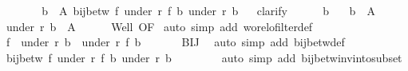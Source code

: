 \begin{isabellebody}
\ \ \isanewline
\ \ \isamarkupfalse%
\ {}{\isacharcolon}{\kern0pt}\ {\isachardoublequoteopen}{\isasymforall}b\ {\isasymin}\ A{\isachardot}{\kern0pt}\ bij{\isacharunderscore}{\kern0pt}betw\ {\isacharquery}{\kern0pt}f{\isacharprime}{\kern0pt}\ {\isacharparenleft}{\kern0pt}under\ r{\isacharprime}{\kern0pt}\ {\isacharparenleft}{\kern0pt}f\ b{\isacharparenright}{\kern0pt}{\isacharparenright}{\kern0pt}\ {\isacharparenleft}{\kern0pt}under\ r\ b{\isacharparenright}{\kern0pt}{\isachardoublequoteclose}\isanewline
\ \ \isamarkupfalse%
{\isacharparenleft}{\kern0pt}clarify{\isacharparenright}{\kern0pt}\isanewline
\ \ \ \ \isamarkupfalse%
\ b\ \isamarkupfalse%
\ {\isacharasterisk}{\kern0pt}{\isacharcolon}{\kern0pt}\ {\isachardoublequoteopen}b\ {\isasymin}\ A{\isachardoublequoteclose}\isanewline
\ \ \ \ \isamarkupfalse%
\ {\isachardoublequoteopen}under\ r\ b\ {\isasymle}\ A{\isachardoublequoteclose}\isanewline
\ \ \ \ \isamarkupfalse%
\ Well\ OF\ \isamarkupfalse%
{\isacharparenleft}{\kern0pt}auto\ simp\ add{\isacharcolon}{\kern0pt}\ wo{\isacharunderscore}{\kern0pt}rel{\isachardot}{\kern0pt}ofilter{\isacharunderscore}{\kern0pt}def{\isacharparenright}{\kern0pt}\isanewline
\ \ \ \ \isamarkupfalse%
\isanewline
\ \ \ \ \isamarkupfalse%
\ {\isachardoublequoteopen}f\ {\isacharbackquote}{\kern0pt}\ {\isacharparenleft}{\kern0pt}under\ r\ b{\isacharparenright}{\kern0pt}\ {\isacharequal}{\kern0pt}\ under\ r{\isacharprime}{\kern0pt}\ {\isacharparenleft}{\kern0pt}f\ b{\isacharparenright}{\kern0pt}{\isachardoublequoteclose}\isanewline
\ \ \ \ \isamarkupfalse%
\ {\isacharasterisk}{\kern0pt}\ BIJ\ \isamarkupfalse%
\ {\isacharparenleft}{\kern0pt}auto\ simp\ add{\isacharcolon}{\kern0pt}\ bij{\isacharunderscore}{\kern0pt}betw{\isacharunderscore}{\kern0pt}def{\isacharparenright}{\kern0pt}\isanewline
\ \ \ \ \isamarkupfalse%
\isanewline
\ \ \ \ \isamarkupfalse%
\ {\isachardoublequoteopen}bij{\isacharunderscore}{\kern0pt}betw\ {\isacharquery}{\kern0pt}f{\isacharprime}{\kern0pt}\ {\isacharparenleft}{\kern0pt}under\ r{\isacharprime}{\kern0pt}\ {\isacharparenleft}{\kern0pt}f\ b{\isacharparenright}{\kern0pt}{\isacharparenright}{\kern0pt}\ {\isacharparenleft}{\kern0pt}under\ r\ b{\isacharparenright}{\kern0pt}{\isachardoublequoteclose}\isanewline
\ \ \ \ \isamarkupfalse%
\ {}\ \isamarkupfalse%
\ {\isacharparenleft}{\kern0pt}auto\ simp\ add{\isacharcolon}{\kern0pt}\ bij{\isacharunderscore}{\kern0pt}betw{\isacharunderscore}{\kern0pt}inv{\isacharunderscore}{\kern0pt}into{\isacharunderscore}{\kern0pt}subset{\isacharparenright}{\kern0pt}\isanewline

\end{isabellebody}
